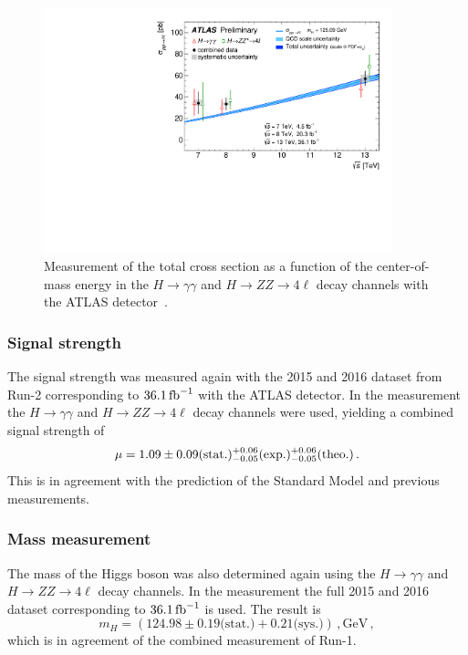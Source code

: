 \begin{figure}[htb]
    \centering
    \includegraphics[width=0.9\textwidth]{./figures/theory/total_xsec_run2.pdf}
    \caption{Measurement of the total cross section as a function of the center-of-mass energy in the $H \to \gamma\gamma$
             and $H \to ZZ \to 4\ell$ decay channels with the ATLAS detector~\cite{ATLAS-CONF-2017-047}.}\label{fig:theory:meas:run2:totalxsec}
\end{figure}

\subsubsection{Signal strength}\label{subsub:theory:meas:run2:totalxsec}

The signal strength was measured again with the 2015 and 2016 dataset from Run-2 corresponding to $\SI{36.1}{\invfb}$ with the ATLAS detector.
In the measurement the $H\to\gamma\gamma$ and $H \to ZZ \to 4\ell$ decay channels were used,
yielding a combined signal strength of~\cite{ATLAS-CONF-2017-047}
\begin{equation}
    \mu = 1.09 \pm 0.09 \text{(stat.)} {}^{+{0.06}}_{-{0.05}} \text{(exp.)} {}^{+{0.06}}_{-{0.05}} \text{(theo.)} \,.
\end{equation}
This is in agreement with the prediction of the Standard Model and previous measurements.

\subsubsection{Mass measurement}\label{subsub:theory:meas:run2:totalxsec}

The mass of the Higgs boson was also determined again using the $H\to\gamma\gamma$ and $H \to ZZ \to 4\ell$ decay channels.
In the measurement the full 2015 and 2016 dataset corresponding to $\SI{36.1}{\invfb}$ is used.
The result is~\cite{ATLAS-CONF-2017-046}
\begin{equation}
    m_H = (124.98 \pm 0.19 \text{(stat.)} + 0.21 \text{(sys.)}) \,, \text{GeV} \,,
\end{equation}
which is in agreement of the combined measurement of Run-1.
